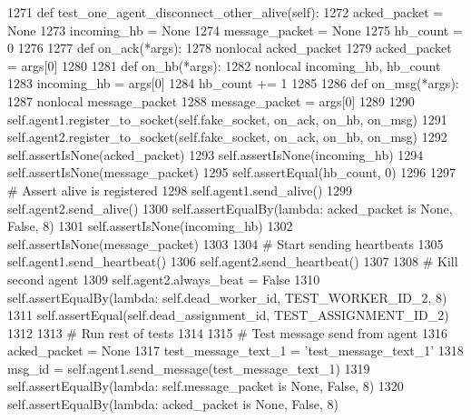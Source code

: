 \begin{DoxyCode}
1271     \textcolor{keyword}{def }test\_one\_agent\_disconnect\_other\_alive(self):
1272         acked\_packet = \textcolor{keywordtype}{None}
1273         incoming\_hb = \textcolor{keywordtype}{None}
1274         message\_packet = \textcolor{keywordtype}{None}
1275         hb\_count = 0
1276 
1277         \textcolor{keyword}{def }on\_ack(*args):
1278             nonlocal acked\_packet
1279             acked\_packet = args[0]
1280 
1281         \textcolor{keyword}{def }on\_hb(*args):
1282             nonlocal incoming\_hb, hb\_count
1283             incoming\_hb = args[0]
1284             hb\_count += 1
1285 
1286         \textcolor{keyword}{def }on\_msg(*args):
1287             nonlocal message\_packet
1288             message\_packet = args[0]
1289 
1290         self.agent1.register\_to\_socket(self.fake\_socket, on\_ack, on\_hb, on\_msg)
1291         self.agent2.register\_to\_socket(self.fake\_socket, on\_ack, on\_hb, on\_msg)
1292         self.assertIsNone(acked\_packet)
1293         self.assertIsNone(incoming\_hb)
1294         self.assertIsNone(message\_packet)
1295         self.assertEqual(hb\_count, 0)
1296 
1297         \textcolor{comment}{# Assert alive is registered}
1298         self.agent1.send\_alive()
1299         self.agent2.send\_alive()
1300         self.assertEqualBy(\textcolor{keyword}{lambda}: acked\_packet \textcolor{keywordflow}{is} \textcolor{keywordtype}{None}, \textcolor{keyword}{False}, 8)
1301         self.assertIsNone(incoming\_hb)
1302         self.assertIsNone(message\_packet)
1303 
1304         \textcolor{comment}{# Start sending heartbeats}
1305         self.agent1.send\_heartbeat()
1306         self.agent2.send\_heartbeat()
1307 
1308         \textcolor{comment}{# Kill second agent}
1309         self.agent2.always\_beat = \textcolor{keyword}{False}
1310         self.assertEqualBy(\textcolor{keyword}{lambda}: self.dead\_worker\_id, TEST\_WORKER\_ID\_2, 8)
1311         self.assertEqual(self.dead\_assignment\_id, TEST\_ASSIGNMENT\_ID\_2)
1312 
1313         \textcolor{comment}{# Run rest of tests}
1314 
1315         \textcolor{comment}{# Test message send from agent}
1316         acked\_packet = \textcolor{keywordtype}{None}
1317         test\_message\_text\_1 = \textcolor{stringliteral}{'test\_message\_text\_1'}
1318         msg\_id = self.agent1.send\_message(test\_message\_text\_1)
1319         self.assertEqualBy(\textcolor{keyword}{lambda}: self.message\_packet \textcolor{keywordflow}{is} \textcolor{keywordtype}{None}, \textcolor{keyword}{False}, 8)
1320         self.assertEqualBy(\textcolor{keyword}{lambda}: acked\_packet \textcolor{keywordflow}{is} \textcolor{keywordtype}{None}, \textcolor{keyword}{False}, 8)

\end{DoxyCode}
